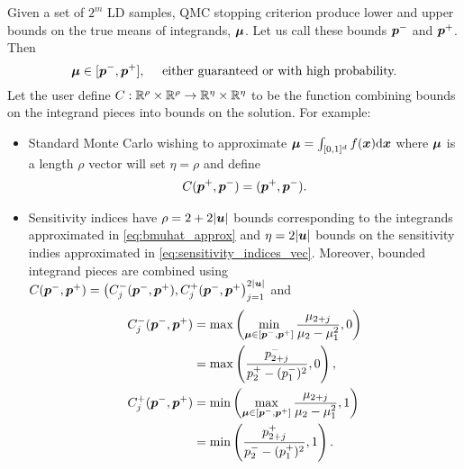 \documentclass{article}
\begin{document}
Given a set of $2^m$ LD samples, QMC stopping criterion produce lower and upper bounds on the true means of integrands, $\boldsymbol{\mu}$. Let us call these bounds $\boldsymbol{p}^-$ and $\boldsymbol{p}^+$. Then 
\begin{equation}
    \boldsymbol{\mu} \in [\boldsymbol{p}^-,\boldsymbol{p}^+], \quad \text{ either guaranteed or with high probability.}
\end{equation}
Let the user define $C: \mathbb{R}^\rho \times \mathbb{R}^\rho \to \mathbb{R}^\eta \times \mathbb{R}^\eta$ to be the function combining bounds on the integrand pieces into bounds on the solution. For example:
\begin{itemize}
    \item Standard Monte Carlo wishing to approximate $\boldsymbol{\mu} = \int_{[0,1]^d} f(\boldsymbol{x})\mathrm{d}\boldsymbol{x}$ where $\boldsymbol{\mu}$ is a length $\rho$ vector will set $\eta = \rho$ and define 
    \begin{align}
        C(\boldsymbol{p}^+,\boldsymbol{p}^-) = (\boldsymbol{p}^+,\boldsymbol{p}^-).
    \end{align}
    \item Sensitivity indices have $\rho=2+2\lvert \boldsymbol{u} \rvert$ bounds corresponding to the integrands approximated in \eqref{eq:bmuhat_approx} and $\eta=2\lvert \boldsymbol{u} \rvert$ bounds on the sensitivity indies approximated in \eqref{eq:sensitivity_indices_vec}. Moreover, bounded integrand pieces are combined using $C(\boldsymbol{p}^-,\boldsymbol{p}^+) = \left(C_j^-(\boldsymbol{p}^-,\boldsymbol{p}^+), C_j^+(\boldsymbol{p}^-,\boldsymbol{p}^+\right)_{j=1}^{2\lvert \boldsymbol{u} \rvert}$ and 
    \begin{align}
        C_j^-(\boldsymbol{p}^-,\boldsymbol{p}^+) 
        &= \max\left(\min_{\boldsymbol{\mu} \in [\boldsymbol{p}^-,\boldsymbol{p}^+]} \frac{\mu_{2+j}}{\mu_2-\mu_1^2}, 0 \right) \\
        &= \max\left(\frac{p_{2+j}^-}{p_2^+-(p_1^-)^2}, 0\right), \\
        C_j^+(\boldsymbol{p}^-,\boldsymbol{p}^+) 
        &= \min\left(\max_{\boldsymbol{\mu} \in [\boldsymbol{p}^-,\boldsymbol{p}^+]} \frac{\mu_{2+j}}{\mu_2-\mu_1^2}, 1\right) \\
        & = \min\left(\frac{p_{2+j}^+}{p_2^- - (p_1^+)^2}, 1\right).
    \end{align}
\end{itemize}
\end{document}
